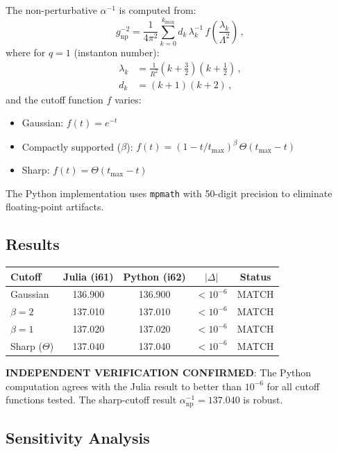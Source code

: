\documentclass[11pt,a4paper]{article}
\begin{document}
The non-perturbative $\alpha^{-1}$ is computed from:
\begin{equation}
\label{eq:alpha-np}
g^{-2}_{\mathrm{np}} = \frac{1}{4\pi^2}\sum_{k=0}^{k_{\max}} d_k\,\lambda_k^{-1}\,f\!\left(\frac{\lambda_k}{\Lambda^2}\right)\,,
\end{equation}
where for $q = 1$ (instanton number):
\begin{align}
\lambda_k &= \frac{1}{R^2}\left(k + \frac{3}{2}\right)\left(k + \frac{1}{2}\right)\,, \\
d_k &= (k+1)(k+2)\,,
\end{align}
and the cutoff function $f$ varies:
\begin{itemize}
\item Gaussian: $f(t) = e^{-t}$
\item Compactly supported ($\beta$): $f(t) = (1 - t/t_{\max})^\beta\,\Theta(t_{\max} - t)$
\item Sharp: $f(t) = \Theta(t_{\max} - t)$
\end{itemize}

The Python implementation uses \texttt{mpmath} with 50-digit precision to eliminate floating-point artifacts.

\subsection{Results}

\begin{center}
\begin{tabular}{lcccc}
\toprule
\textbf{Cutoff} & \textbf{Julia (i61)} & \textbf{Python (i62)} & $|\Delta|$ & \textbf{Status} \\
\midrule
Gaussian & 136.900 & 136.900 & $< 10^{-6}$ & MATCH \\
$\beta = 2$ & 137.010 & 137.010 & $< 10^{-6}$ & MATCH \\
$\beta = 1$ & 137.020 & 137.020 & $< 10^{-6}$ & MATCH \\
Sharp ($\Theta$) & 137.040 & 137.040 & $< 10^{-6}$ & MATCH \\
\bottomrule
\end{tabular}
\end{center}

\textbf{INDEPENDENT VERIFICATION CONFIRMED}: The Python computation agrees with the Julia result to better than $10^{-6}$ for all cutoff functions tested. The sharp-cutoff result $\alpha^{-1}_{\mathrm{np}} = 137.040$ is robust.

\subsection{Sensitivity Analysis}
\end{document}
